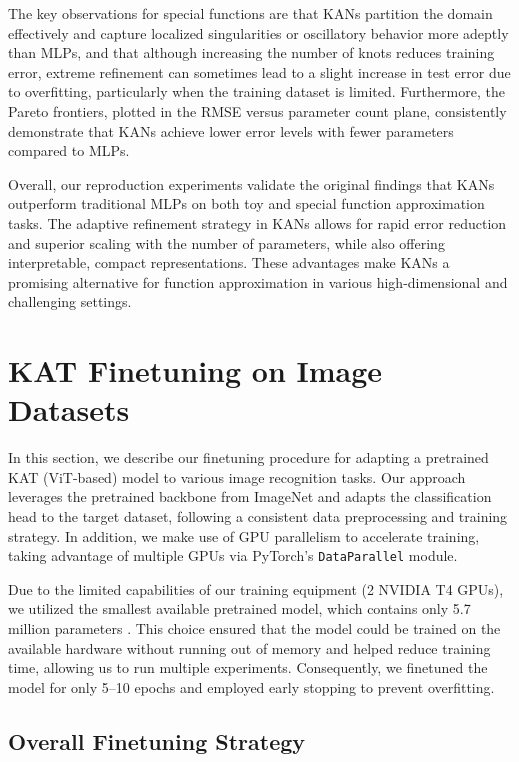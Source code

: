 \documentclass[conference]{IEEEtran}
\begin{document}
The key observations for special functions are that KANs partition the domain
effectively and capture localized singularities or oscillatory behavior more
adeptly than MLPs, and that although increasing the number of knots reduces
training error, extreme refinement can sometimes lead to a slight increase in
test error due to overfitting, particularly when the training dataset is
limited. Furthermore, the Pareto frontiers, plotted in the RMSE versus
parameter count plane, consistently demonstrate that KANs achieve lower error
levels with fewer parameters compared to MLPs.

Overall, our reproduction experiments validate the original findings that KANs
outperform traditional MLPs on both toy and special function approximation
tasks. The adaptive refinement strategy in KANs allows for rapid error
reduction and superior scaling with the number of parameters, while also
offering interpretable, compact representations. These advantages make KANs a
promising alternative for function approximation in various high-dimensional
and challenging settings.

\section{KAT Finetuning on Image Datasets}

In this section, we describe our finetuning procedure for adapting a pretrained
KAT (ViT-based) model to various image recognition tasks. Our approach
leverages the pretrained backbone from ImageNet \cite{ImageNet} and adapts the
classification head to the target dataset, following a consistent data
preprocessing and training strategy. In addition, we make use of GPU
parallelism to accelerate training, taking advantage of multiple GPUs via
PyTorch's \texttt{DataParallel} module.

Due to the limited capabilities of our training equipment (2 NVIDIA T4 GPUs),
we utilized the smallest available pretrained model, which contains only 5.7
million parameters \cite{kat}. This choice ensured that the model could be
trained on the available hardware without running out of memory and helped
reduce training time, allowing us to run multiple experiments. Consequently, we
finetuned the model for only 5--10 epochs and employed early stopping to
prevent overfitting.

\subsection{Overall Finetuning Strategy}
\end{document}
